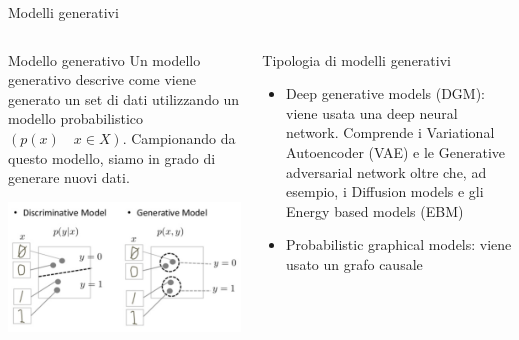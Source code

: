 \documentclass[11pt]{beamer}
\begin{document}
\begin{frame}{Modelli generativi \cite{google_generativeIA,pml1Book,pml2Book}}
\begin{columns}
\begin{column}{0.5\textwidth}
\begin{alertblock}{Modello generativo}
Un modello generativo descrive come viene generato un set di dati utilizzando un modello probabilistico $(p(x)\quad x\in X)$. Campionando da questo modello, siamo in grado di generare nuovi dati.
\end{alertblock}
\begin{center}
\includegraphics[width=\textwidth]{Pic/generative_v_discriminative.png}
\end{center}
\end{column}
\begin{column}{0.4\textwidth}  
\begin{alertblock}{Tipologia di modelli generativi}
\begin{itemize}
\item Deep generative models (DGM): viene usata una deep neural network. Comprende i Variational Autoencoder (VAE) e le Generative adversarial network oltre che, ad esempio, i Diffusion models e gli Energy based models (EBM)
\item Probabilistic graphical models: viene usato un grafo causale 
\end{itemize}
\end{alertblock}
\end{column}
\end{columns}
\end{frame}
\end{document}
